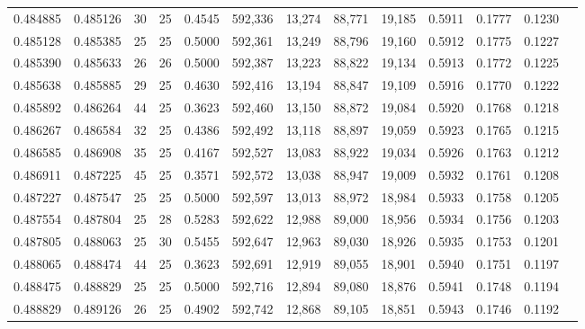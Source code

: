 \begin{tabular}{rrrrrrrrrrrrr}
0.484885 & 0.485126 &    30 &  25 &                                     0.4545 & 592,336 &  13,274 &  88,771 &  19,185 & 0.5911 & 0.1777 & 0.1230 \\
0.485128 & 0.485385 &    25 &  25 &                                     0.5000 & 592,361 &  13,249 &  88,796 &  19,160 & 0.5912 & 0.1775 & 0.1227 \\
0.485390 & 0.485633 &    26 &  26 &                                     0.5000 & 592,387 &  13,223 &  88,822 &  19,134 & 0.5913 & 0.1772 & 0.1225 \\
0.485638 & 0.485885 &    29 &  25 &                                     0.4630 & 592,416 &  13,194 &  88,847 &  19,109 & 0.5916 & 0.1770 & 0.1222 \\
0.485892 & 0.486264 &    44 &  25 &                                     0.3623 & 592,460 &  13,150 &  88,872 &  19,084 & 0.5920 & 0.1768 & 0.1218 \\
0.486267 & 0.486584 &    32 &  25 &                                     0.4386 & 592,492 &  13,118 &  88,897 &  19,059 & 0.5923 & 0.1765 & 0.1215 \\
0.486585 & 0.486908 &    35 &  25 &                                     0.4167 & 592,527 &  13,083 &  88,922 &  19,034 & 0.5926 & 0.1763 & 0.1212 \\
0.486911 & 0.487225 &    45 &  25 &                                     0.3571 & 592,572 &  13,038 &  88,947 &  19,009 & 0.5932 & 0.1761 & 0.1208 \\
0.487227 & 0.487547 &    25 &  25 &                                     0.5000 & 592,597 &  13,013 &  88,972 &  18,984 & 0.5933 & 0.1758 & 0.1205 \\
0.487554 & 0.487804 &    25 &  28 &                                     0.5283 & 592,622 &  12,988 &  89,000 &  18,956 & 0.5934 & 0.1756 & 0.1203 \\
0.487805 & 0.488063 &    25 &  30 &                                     0.5455 & 592,647 &  12,963 &  89,030 &  18,926 & 0.5935 & 0.1753 & 0.1201 \\
0.488065 & 0.488474 &    44 &  25 &                                     0.3623 & 592,691 &  12,919 &  89,055 &  18,901 & 0.5940 & 0.1751 & 0.1197 \\
0.488475 & 0.488829 &    25 &  25 &                                     0.5000 & 592,716 &  12,894 &  89,080 &  18,876 & 0.5941 & 0.1748 & 0.1194 \\
0.488829 & 0.489126 &    26 &  25 &                                     0.4902 & 592,742 &  12,868 &  89,105 &  18,851 & 0.5943 & 0.1746 & 0.1192 \\

\end{tabular}
